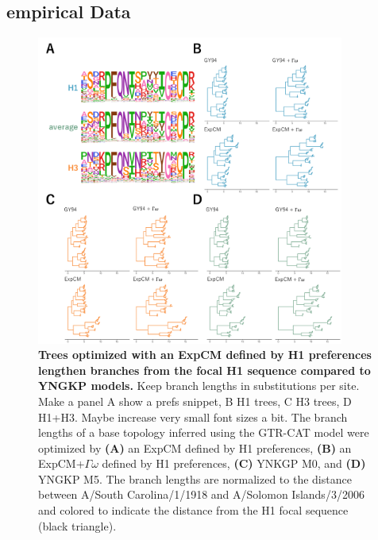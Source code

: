 \documentclass[11pt]{article}
\newcommand\jdbcomment[1]{{\color{red}#1}}
\begin{document}
\subsection*{empirical Data}

\begin{figure}[H]
\centerline{\includegraphics[width=0.90\textwidth]{figures/empirical_trees}}
\caption{\label{fig:empirical_trees}
\textbf{Trees optimized with an ExpCM defined by H1 preferences lengthen branches from the focal H1 sequence compared to YNGKP models.} 
\jdbcomment{Keep branch lengths in substitutions per site. Make a panel A show a prefs snippet, B H1 trees, C H3 trees, D H1+H3. Maybe increase very small font sizes a bit.}
The branch lengths of a base topology inferred using the GTR-CAT model were optimized by \textbf{(A)} an ExpCM defined by H1 preferences, \textbf{(B)} an ExpCM+$\Gamma\omega$ defined by H1 preferences, \textbf{(C)} YNKGP M0, and \textbf{(D)} YNGKP M5.
The branch lengths are normalized to the distance between A/South Carolina/1/1918 and A/Solomon Islands/3/2006 and colored to indicate the distance from the H1 focal sequence (black triangle).
}
\end{figure}
\end{document}
